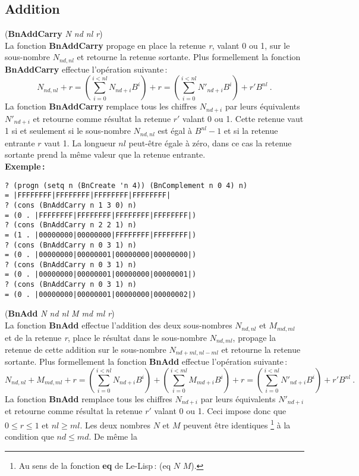 \subsection{Addition}
({\bf BnAddCarry} {\em N nd nl r})
\\[12pt]
La fonction {\bf BnAddCarry} propage en place la retenue {\em r}, valant 0
ou 1,  sur le sous-nombre $N_{nd,nl}$ et retourne la retenue sortante. Plus
formellement la fonction {\bf BnAddCarry} effectue l'op\'eration suivante\,:
\[ N_{nd,nl} + r = (\sum_{i=0}^{i<nl}N_{nd+i} B^i) + r = (\sum_{i=0}^{i<nl}N'_{nd+i} B^i) + r' B^{nl}\ .\]
La fonction {\bf BnAddCarry} remplace tous les chiffres $N_{nd+i}$ par leurs
\'equivalents $N'_{nd+i}$ et retourne comme r\'esultat la retenue $r'$ valant
0 ou 1. Cette retenue vaut 1 si et seulement si le sous-nombre $N_{nd,nl}$
est \'egal \`a $B^{nl} - 1$ et si la retenue entrante $r$ vaut 1. La longueur
$nl$ peut-\^etre \'egale \`a z\'ero, dans ce cas la retenue sortante prend la
m\^eme valeur que la retenue entrante.
\\[18pt]
{\bf Exemple\,:}
\begin{verbatim}
? (progn (setq n (BnCreate 'n 4)) (BnComplement n 0 4) n)
= |FFFFFFFF|FFFFFFFF|FFFFFFFF|FFFFFFFF|
? (cons (BnAddCarry n 1 3 0) n)
= (0 . |FFFFFFFF|FFFFFFFF|FFFFFFFF|FFFFFFFF|)
? (cons (BnAddCarry n 2 2 1) n)
= (1 . |00000000|00000000|FFFFFFFF|FFFFFFFF|)
? (cons (BnAddCarry n 0 3 1) n)
= (0 . |00000000|00000001|00000000|00000000|)
? (cons (BnAddCarry n 0 3 1) n)
= (0 . |00000000|00000001|00000000|00000001|)
? (cons (BnAddCarry n 0 3 1) n)
= (0 . |00000000|00000001|00000000|00000002|)
\end{verbatim}
\vspace*{24pt}
({\bf BnAdd} {\em N nd nl M md ml r})
\\[12pt]
La fonction {\bf BnAdd} effectue l'addition des deux sous-nombres
$N_{nd,nl}$ et $M_{md,ml}$ et de la retenue {\em r}, place le
r\'esultat dans le sous-nombre $N_{nd,ml}$, propage la retenue de cette
addition sur le sous-nombre $N_{nd+ml,nl-ml}$ et retourne la retenue
sortante. Plus formellement la fonction {\bf BnAdd} effectue l'op\'eration
suivante\,:
\[ N_{nd,nl} + M_{md,ml} + r = (\sum_{i=0}^{i<nl}N_{nd+i} B^i) + (\sum_{i=0}^{i<ml}M_{md+i} B^i) + r = (\sum_{i=0}^{i<nl}N'_{nd+i} B^i) + r' B^{nl}\ .\]
La fonction {\bf BnAdd} remplace tous les chiffres $N_{nd+i}$ par leurs
\'equivalents $N'_{nd+i}$ et retourne comme r\'esultat la retenue $r'$ valant 0
ou 1. Ceci impose donc que $0 \leq r \leq 1$ et $nl \geq ml$. Les deux nombres
$N$ et $M$ peuvent \^etre identiques \footnote{Au sens de la fonction {\bf eq}
de Le-Lisp\,: (eq $N$ $M$).} \`a la condition que $nd \leq md$. De m\^eme la
